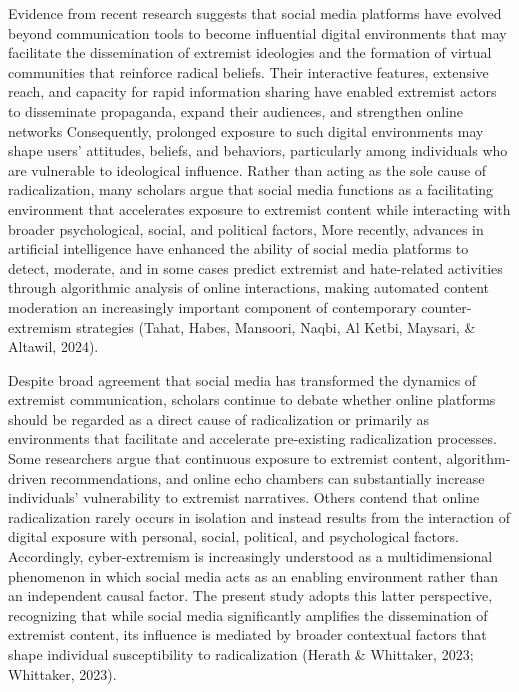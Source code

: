 \documentclass{NSP1}
\begin{document}
Evidence from recent research suggests that social media platforms have evolved beyond communication tools to become influential digital environments that may facilitate the dissemination of extremist ideologies and the formation of virtual communities that reinforce radical beliefs. Their interactive features, extensive reach, and capacity for rapid information sharing have enabled extremist actors to disseminate propaganda, expand their audiences, and strengthen online networks Consequently, prolonged exposure to such digital environments may shape users' attitudes, beliefs, and behaviors, particularly among individuals who are vulnerable to ideological influence. Rather than acting as the sole cause of radicalization, many scholars argue that social media functions as a facilitating environment that accelerates exposure to extremist content while interacting with broader psychological, social, and political factors, More recently, advances in artificial intelligence have enhanced the ability of social media platforms to detect, moderate, and in some cases predict extremist and hate-related activities through algorithmic analysis of online interactions, making automated content moderation an increasingly important component of contemporary counter-extremism strategies (Tahat, Habes, Mansoori, Naqbi, Al Ketbi, Maysari, \& Altawil, 2024).

Despite broad agreement that social media has transformed the dynamics of extremist communication, scholars continue to debate whether online platforms should be regarded as a direct cause of radicalization or primarily as environments that facilitate and accelerate pre-existing radicalization processes. Some researchers argue that continuous exposure to extremist content, algorithm-driven recommendations, and online echo chambers can substantially increase individuals' vulnerability to extremist narratives. Others contend that online radicalization rarely occurs in isolation and instead results from the interaction of digital exposure with personal, social, political, and psychological factors. Accordingly, cyber-extremism is increasingly understood as a multidimensional phenomenon in which social media acts as an enabling environment rather than an independent causal factor. The present study adopts this latter perspective, recognizing that while social media significantly amplifies the dissemination of extremist content, its influence is mediated by broader contextual factors that shape individual susceptibility to radicalization (Herath \& Whittaker, 2023; Whittaker, 2023).
\end{document}
